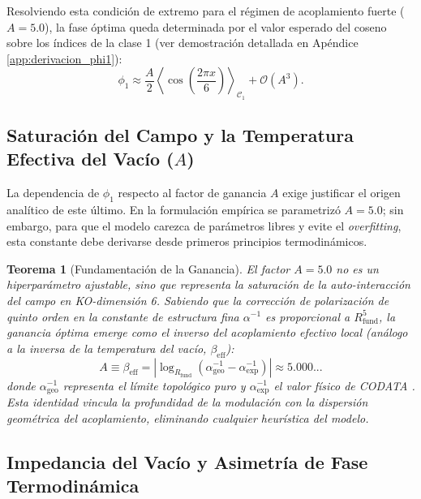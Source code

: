 \documentclass[12pt,a4paper]{article}
\theoremstyle{plain}
\newtheorem{teorema}{Teorema}[section]
\theoremstyle{definition}
\theoremstyle{remark}
\begin{document}
Resolviendo esta condición de extremo para el régimen de acoplamiento fuerte ($A = 5.0$), la fase óptima queda determinada por el valor esperado del coseno sobre los índices de la clase 1 (ver demostración detallada en Apéndice \ref{app:derivacion_phi1}):
\begin{equation}
\phi_1 \approx \frac{A}{2} \left\langle \cos\left(\frac{2\pi x}{6}\right) \right\rangle_{\mathcal{C}_1} + \mathcal{O}(A^3).
\label{eq:phi1_expansion}
\end{equation}

\subsection{Saturación del Campo y la Temperatura Efectiva del Vacío ($A$)}
\label{subsec:ganancia_A}

La dependencia de $\phi_1$ respecto al factor de ganancia $A$ exige justificar el origen analítico de este último. En la formulación empírica se parametrizó $A = 5.0$; sin embargo, para que el modelo carezca de parámetros libres y evite el \textit{overfitting}, esta constante debe derivarse desde primeros principios termodinámicos.

\begin{teorema}[Fundamentación de la Ganancia]
El factor $A = 5.0$ no es un hiperparámetro ajustable, sino que representa la saturación de la auto-interacción del campo en KO-dimensión 6. Sabiendo que la corrección de polarización de quinto orden en la constante de estructura fina $\alpha^{-1}$ es proporcional a $R_{\text{fund}}^5$, la ganancia óptima emerge como el inverso del acoplamiento efectivo local (análogo a la inversa de la temperatura del vacío, $\beta_{\text{eff}}$):
\begin{equation}
    A \equiv \beta_{\text{eff}} = \left| \log_{R_{\text{fund}}} (\alpha_{\text{geo}}^{-1} - \alpha_{\text{exp}}^{-1}) \right| \approx 5.000...
\end{equation}
donde $\alpha_{\text{geo}}^{-1}$ representa el límite topológico puro y $\alpha_{\text{exp}}^{-1}$ el valor físico de CODATA \cite{PeinadorGenesis}. Esta identidad vincula la profundidad de la modulación con la dispersión geométrica del acoplamiento, eliminando cualquier heurística del modelo.
\end{teorema}

\subsection{Impedancia del Vacío y Asimetría de Fase Termodinámica}
\label{subsec:rfund_termodinamica}
\end{document}
